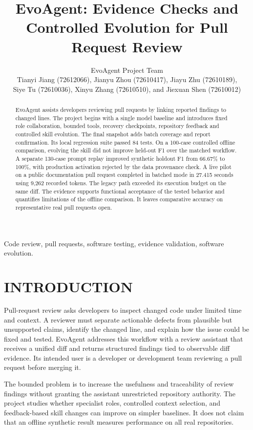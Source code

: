 \documentclass[journal,compsoc]{IEEEtran}
\title{EvoAgent: Evidence Checks and Controlled Evolution for Pull Request Review}
\author{EvoAgent Project Team\\Tianyi Jiang (72612066), Jianyu Zhou (72610417), Jiayu Zhu (72610189),\\ Siye Tu (72610036), Xinyu Zhang (72610510), and Jiexuan Shen (72610012)}
\begin{document}
\maketitle
\begin{abstract}
EvoAgent assists developers reviewing pull requests by linking reported findings to changed lines. The project begins with a single model baseline and introduces fixed role collaboration, bounded tools, recovery checkpoints, repository feedback and controlled skill evolution. The final snapshot adds batch coverage and report confirmation. Its local regression suite passed 84 tests. On a 100-case controlled offline comparison, evolving the skill did not improve held-out F1 over the matched workflow. A separate 130-case prompt replay improved synthetic holdout F1 from 66.67\% to 100\%, with production activation rejected by the data provenance check. A live pilot on a public documentation pull request completed in batched mode in 27.415 seconds using 9,262 recorded tokens. The legacy path exceeded its execution budget on the same diff. The evidence supports functional acceptance of the tested behavior and quantifies limitations of the offline comparison. It leaves comparative accuracy on representative real pull requests open.
\end{abstract}
\begin{IEEEkeywords}
Code review, pull requests, software testing, evidence validation, software evolution.
\end{IEEEkeywords}

\section{INTRODUCTION}
Pull-request review asks developers to inspect changed code under limited time and context. A reviewer must separate actionable defects from plausible but unsupported claims, identify the changed line, and explain how the issue could be fixed and tested. EvoAgent addresses this workflow with a review assistant that receives a unified diff and returns structured findings tied to observable diff evidence. Its intended user is a developer or development team reviewing a pull request before merging it.

The bounded problem is to increase the usefulness and traceability of review findings without granting the assistant unrestricted repository authority. The project studies whether specialist roles, controlled context selection, and feedback-based skill changes can improve on simpler baselines. It does not claim that an offline synthetic result measures performance on all real repositories.
\end{document}
